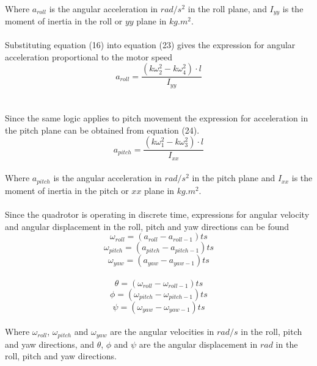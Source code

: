 \\
Where $a_{roll}$ is the angular acceleration in $rad/s^2$ in the roll plane, and $I_{yy}$ is the moment of inertia in the roll or $yy$ plane in $kg.m^2$. 
\\\\
Substituting equation (16) into equation (23) gives the expression for angular acceleration proportional to the motor speed
\begin{equation}
a_{roll} = \frac{(k\omega_2^2-k\omega_4^2)\cdot l}{I_{yy}}
\end{equation}
\\\\
Since the same logic applies to pitch movement the expression for acceleration in the pitch plane can be obtained from equation (24). 
\begin{equation}
a_{pitch} = \frac{(k\omega_1^2-k\omega_3^2)\cdot l}{I_{xx}}
\end{equation}
\\
Where $a_{pitch}$ is the angular acceleration in $rad/s^2$ in the pitch plane and $I_{xx}$ is the moment of inertia in the pitch or $xx$ plane in $kg.m^2$. 
\\\\
Since the quadrotor is operating in discrete time, expressions for angular velocity and angular displacement in the roll, pitch and yaw directions can be found 
\begin{equation}
\omega_{roll} = (a_{roll} - a_{roll-1})ts
\end{equation}
\begin{equation}
\omega_{pitch} = (a_{pitch} - a_{pitch-1})ts
\end{equation}
\begin{equation}
\omega_{yaw} = (a_{yaw} - a_{yaw-1})ts
\end{equation}
\\
\begin{equation}
\theta = (\omega_{roll} - \omega_{roll-1})ts
\end{equation}
\begin{equation}
\phi = (\omega_{pitch} - \omega_{pitch-1})ts
\end{equation}
\begin{equation}
\psi = (\omega_{yaw} - \omega_{yaw-1})ts
\end{equation}
\\
Where $\omega_{roll}$, $\omega_{pitch}$ and $\omega_{yaw}$ are the angular velocities in $rad/s$ in the roll, pitch and yaw directions, and $\theta$, $\phi$ and $\psi$ are the angular displacement in $rad$ in the roll, pitch and yaw directions.  
